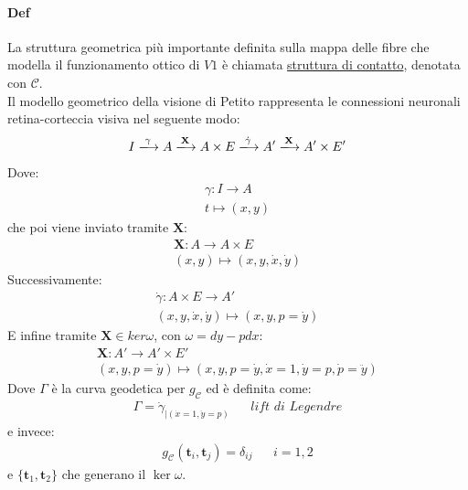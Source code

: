 \paragraph*{Def}La struttura geometrica più importante definita sulla mappa delle fibre che modella il funzionamento ottico di $V1$ è chiamata \underline{struttura di contatto}, denotata con $\mathcal{C}$.\\
Il modello geometrico della visione di Petito rappresenta le connessioni neuronali retina-corteccia visiva nel seguente modo:
\begin{align*}
    I\xlongrightarrow[]{\gamma}A \xlongrightarrow[]{\mathbf{X}}A\times E\xlongrightarrow[]{\dot{\gamma}}A'\xlongrightarrow[]{\mathbf{X}}A'\times E'
\end{align*}
Dove:
\begin{align*}
    \gamma \colon I \to A\\
    t\mapsto (x,y)
\end{align*}
che poi viene inviato tramite $\mathbf{X}$:
\begin{align*}
    \mathbf{X}\colon A \to A\times E\\
    (x,y)\mapsto (x,y,\dot{x},\dot{y})
\end{align*}
Successivamente:
\begin{align*}
    \dot{\gamma}\colon A\times E\to A'\\
    (x,y,\dot{x},\dot{y})\mapsto (x,y,p=\dot{y})
\end{align*}
E infine tramite $\mathbf{X}\in ker\omega$, con $\omega=dy-pdx$:
\begin{align*}
    \mathbf{X}\colon A'\to A'\times E'\\
    (x,y,p=\dot{y})\mapsto (x,y,p=\dot{y},\dot{x}=1,\dot{y}=p,\dot{p}=\ddot{y})
\end{align*}
Dove $\Gamma$ è la curva geodetica per $g_{\mathcal{C}}$ ed è definita come:
\begin{align*}
    \Gamma= \dot{\gamma}_{|(\dot{x}=1,\dot{y}=p)} && \textit{lift di Legendre}
\end{align*}
e invece:
\begin{align*}
    g_{\mathcal{C}}(\mathbf{t}_i,\mathbf{t}_j)=\delta_{ij}&& i=1,2
\end{align*}
e $\{\mathbf{t}_1,\mathbf{t}_2\}$ che generano il $\ker\omega$.


